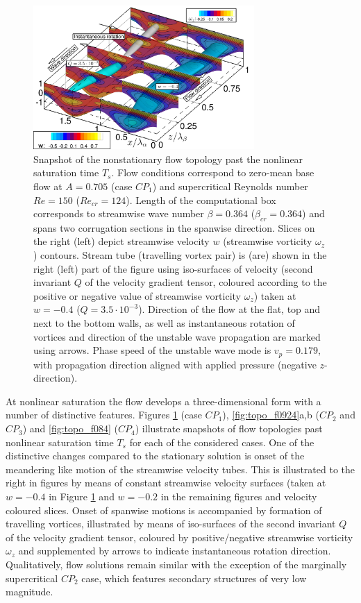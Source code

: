 \documentclass[lineno]{jfm}
\begin{document}
\begin{figure}
\centering
    \includegraphics[width=0.75\textwidth]{f141.png}
	\caption{Snapshot of the nonstationary flow topology past the nonlinear saturation time $T_s$. Flow conditions correspond to zero-mean base flow at $A=0.705$ (case $CP_1$) and supercritical Reynolds number $Re=150$ ($Re_{cr}=124$). Length of the computational box corresponds to streamwise wave number $\beta=0.364$ ($\beta_{cr}=0.364$) and spans two corrugation sections in the spanwise direction. Slices on the right (left) depict streamwise velocity $w$ (streamwise vorticity $\omega_z$) contours. Stream tube (travelling vortex pair) is (are) shown in the right (left) part of the figure using iso-surfaces of velocity (second invariant $Q$ of the velocity gradient tensor, coloured according to the positive or negative value of streamwise vorticity $\omega_z$) taken at $w=-0.4$ ($Q=3.5\cdot10^{-3}$). Direction of the flow at the flat, top and next to the bottom walls, as well as instantaneous rotation of vortices and direction of the unstable wave propagation are marked using arrows. Phase speed of the unstable wave mode is $v_p=0.179$, with propagation direction aligned with applied pressure (negative $z$-direction).}
	\label{fig:topo_f141}
\end{figure}

At nonlinear saturation the flow develops a three-dimensional form with a number of distinctive features.
Figures \ref{fig:topo_f141} (case $CP_1$), \ref{fig:topo_f0924}a,b ($CP_2$ and $CP_3$) and \ref{fig:topo_f084} ($CP_4$) illustrate snapshots of flow topologies past nonlinear saturation time $T_s$ for each of the considered cases.
One of the distinctive changes compared to the stationary solution is onset of the meandering like motion of the streamwise velocity tubes.
This is illustrated to the right in figures by means of constant streamwise velocity surfaces (taken at $w=-0.4$ in Figure \ref{fig:topo_f141} and $w=-0.2$ in the remaining figures and velocity coloured slices.
Onset of spanwise motions is accompanied by formation of travelling vortices, illustrated by means of iso-surfaces of the second invariant $Q$ of the velocity gradient tensor, coloured by positive/negative streamwise vorticity $\omega_z$ and supplemented by arrows to indicate instantaneous rotation direction.
Qualitatively, flow solutions remain similar with the exception of the marginally supercritical $CP_2$ case, which features secondary structures of very low magnitude.
\end{document}
